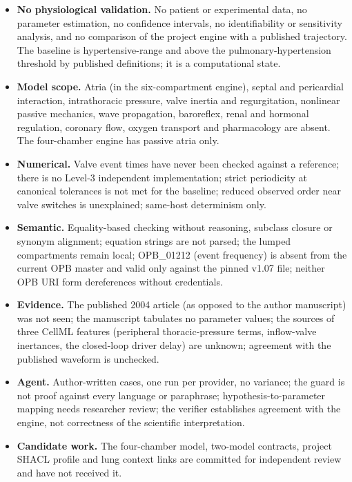 \documentclass[11pt,letterpaper]{article}
\begin{document}
\begin{itemize}[leftmargin=*]
\item \textbf{No physiological validation.} No patient or experimental data, no parameter estimation, no confidence intervals, no identifiability or sensitivity analysis, and no comparison of the project engine with a published trajectory. The baseline is hypertensive-range and above the pulmonary-hypertension threshold by published definitions; it is a computational state.
\item \textbf{Model scope.} Atria (in the six-compartment engine), septal and pericardial interaction, intrathoracic pressure, valve inertia and regurgitation, nonlinear passive mechanics, wave propagation, baroreflex, renal and hormonal regulation, coronary flow, oxygen transport and pharmacology are absent. The four-chamber engine has passive atria only.
\item \textbf{Numerical.} Valve event times have never been checked against a reference; there is no Level-3 independent implementation; strict periodicity at canonical tolerances is not met for the baseline; reduced observed order near valve switches is unexplained; same-host determinism only.
\item \textbf{Semantic.} Equality-based checking without reasoning, subclass closure or synonym alignment; equation strings are not parsed; the lumped compartments remain local; OPB\_01212 (event frequency) is absent from the current OPB master and valid only against the pinned v1.07 file; neither OPB URI form dereferences without credentials.
\item \textbf{Evidence.} The published 2004 article (as opposed to the author manuscript) was not seen; the manuscript tabulates no parameter values; the sources of three CellML features (peripheral thoracic-pressure terms, inflow-valve inertances, the closed-loop driver delay) are unknown; agreement with the published waveform is unchecked.
\item \textbf{Agent.} Author-written cases, one run per provider, no variance; the guard is not proof against every language or paraphrase; hypothesis-to-parameter mapping needs researcher review; the verifier establishes agreement with the engine, not correctness of the scientific interpretation.
\item \textbf{Candidate work.} The four-chamber model, two-model contracts, project SHACL profile and lung context links are committed for independent review and have not received it.
\end{itemize}
\end{document}
